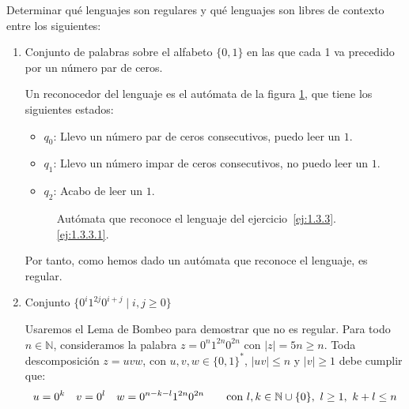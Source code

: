 \begin{ejercicio}\label{ej:1.3.3}
    Determinar qué lenguajes son regulares y qué lenguajes son libres de contexto entre los siguientes:
    \begin{enumerate}
        \item \label{ej:1.3.3.1}
        Conjunto de palabras sobre el alfabeto $\{0,1\}$ en las que cada 1 va precedido por un número par de ceros.
        
        Un reconocedor del lenguaje es el autómata de la figura \ref{fig:1.3.3-1},
        que tiene los siguientes estados:
        \begin{itemize}
            \item $q_0$: Llevo un número par de ceros consecutivos, puedo leer un $1$.
            \item $q_1$: Llevo un número impar de ceros consecutivos, no puedo leer un $1$.
            \item $q_2$: Acabo de leer un $1$.
        \end{itemize}
        \begin{figure}[H]
            \centering
            \caption{Autómata que reconoce el lenguaje del ejercicio~\ref{ej:1.3.3}.\ref{ej:1.3.3.1}.}
            \label{fig:1.3.3-1}
        \end{figure}

        Por tanto, como hemos dado un autómata que reconoce el lenguaje, es regular.
        
        \item Conjunto $\{0^i 1^{2j}0^{i+j} \mid i,j\geq 0\}$
        
        Usaremos el Lema de Bombeo para demostrar que no es regular. Para todo $n\in \mathbb{N}$, consideramos la palabra $z=0^n1^{2n}0^{2n}$ con $|z|=5n\geq n$. Toda descomposición $z=uvw$, con $u,v,w\in \{0,1\}^\ast$, $|uv|\leq n$ y $|v|\geq 1$ debe cumplir que:
        \begin{equation*}
            u=0^k \quad v=0^l \quad w=0^{n-k-l}1^{2n}0^{2n} \qquad \text{con } l,k\in \mathbb{N}\cup \{0\},~l\geq 1,~k+l\leq n
        \end{equation*}


\end{enumerate}
\end{ejercicio}
